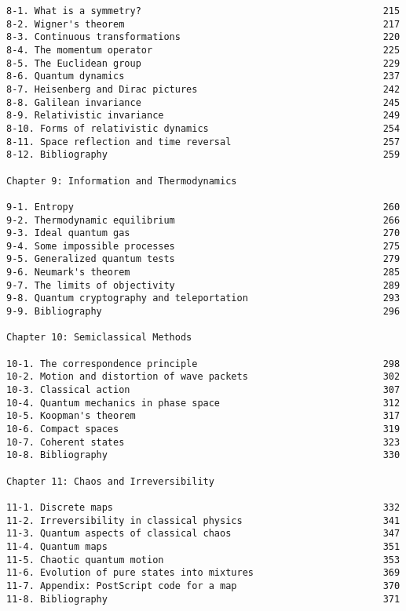 \begin{verbatim}
8-1. What is a symmetry?                                           215 
8-2. Wigner's theorem                                              217 
8-3. Continuous transformations                                    220 
8-4. The momentum operator                                         225 
8-5. The Euclidean group                                           229 
8-6. Quantum dynamics                                              237 
8-7. Heisenberg and Dirac pictures                                 242 
8-8. Galilean invariance                                           245 
8-9. Relativistic invariance                                       249 
8-10. Forms of relativistic dynamics                               254 
8-11. Space reflection and time reversal                           257 
8-12. Bibliography                                                 259
     
Chapter 9: Information and Thermodynamics  
 
9-1. Entropy                                                       260 
9-2. Thermodynamic equilibrium                                     266 
9-3. Ideal quantum gas                                             270 
9-4. Some impossible processes                                     275 
9-5. Generalized quantum tests                                     279 
9-6. Neumark's theorem                                             285 
9-7. The limits of objectivity                                     289 
9-8. Quantum cryptography and teleportation                        293 
9-9. Bibliography                                                  296
 
Chapter 10: Semiclassical Methods  
 
10-1. The correspondence principle                                 298 
10-2. Motion and distortion of wave packets                        302 
10-3. Classical action                                             307 
10-4. Quantum mechanics in phase space                             312 
10-5. Koopman's theorem                                            317 
10-6. Compact spaces                                               319 
10-7. Coherent states                                              323 
10-8. Bibliography                                                 330
 
Chapter 11: Chaos and Irreversibility  
 
11-1. Discrete maps                                                332 
11-2. Irreversibility in classical physics                         341 
11-3. Quantum aspects of classical chaos                           347 
11-4. Quantum maps                                                 351 
11-5. Chaotic quantum motion                                       353 
11-6. Evolution of pure states into mixtures                       369 
11-7. Appendix: PostScript code for a map                          370 
11-8. Bibliography                                                 371


\end{verbatim}

